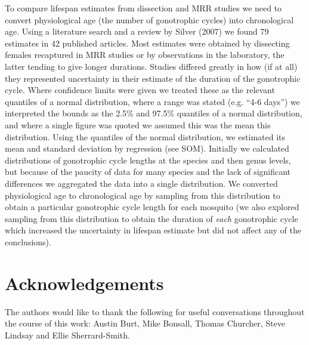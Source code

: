 \documentclass[]{article}
\begin{document}
To compare lifespan estimates from dissection and MRR studies we need to
convert physiological age (the number of gonotrophic cycles) into
chronological age. Using a literature search and a review by Silver
(2007) we found 79 estimates in 42 published articles. Most estimates
were obtained by dissecting females recaptured in MRR studies or by
observations in the laboratory, the latter tending to give longer
durations. Studies differed greatly in how (if at all) they represented
uncertainty in their estimate of the duration of the gonotrophic cycle.
Where confidence limits were given we treated these as the relevant
quantiles of a normal distribution, where a range was stated (e.g. ``4-6
days'') we interpreted the bounds as the 2.5\% and 97.5\% quantiles of a
normal distribution, and where a single figure was quoted we assumed
this was the mean this distribution. Using the quantiles of the normal
distribution, we estimated its mean and standard deviation by regression
(see SOM). Initially we calculated distributions of gonotrophic cycle
lengths at the species and then genus levels, but because of the paucity
of data for many species and the lack of significant differences we
aggregated the data into a single distribution. We converted
physiological age to chronological age by sampling from this
distribution to obtain a particular gonotrophic cycle length for each
mosquito (we also explored sampling from this distribution to obtain the
duration of \emph{each} gonotrophic cycle which increased the
uncertainty in lifespan estimate but did not affect any of the
conclusions).

\section{Acknowledgements}\label{acknowledgements}

The authors would like to thank the following for useful conversations
throughout the course of this work: Austin Burt, Mike Bonsall, Thomas Churcher, Steve
Lindsay and Ellie Sherrard-Smith.

\printbibliography
\end{document}
